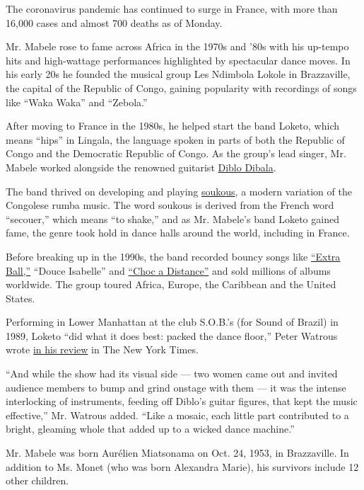 The coronavirus pandemic has continued to surge in France, with more
than 16,000 cases and almost 700 deaths as of Monday.

Mr. Mabele rose to fame across Africa in the 1970s and '80s with his
up-tempo hits and high-wattage performances highlighted by spectacular
dance moves. In his early 20s he founded the musical group Les Ndimbola
Lokole in Brazzaville, the capital of the Republic of Congo, gaining
popularity with recordings of songs like ``Waka Waka'' and ``Zebola.''

After moving to France in the 1980s, he helped start the band Loketo,
which means ``hips'' in Lingala, the language spoken in parts of both
the Republic of Congo and the Democratic Republic of Congo. As the
group's lead singer, Mr. Mabele worked alongside the renowned guitarist
\href{http://africanmusic.org/artists/diblo.html}{Diblo Dibala}.

The band thrived on developing and playing
\href{https://www.last.fm/tag/soukous}{soukous}, a modern variation of
the Congolese rumba music. The word soukous is derived from the French
word ``secouer,'' which means ``to shake,'' and as Mr. Mabele's band
Loketo gained fame, the genre took hold in dance halls around the world,
including in France.

Before breaking up in the 1990s, the band recorded bouncy songs like
\href{https://www.youtube.com/watch?v=ug4lzZNUo1M}{``Extra Ball,''}
``Douce Isabelle'' and
\href{https://www.dailymotion.com/video/x1ju7ip}{``Choc a Distance''}
and sold millions of albums worldwide. The group toured Africa, Europe,
the Caribbean and the United States.

Performing in Lower Manhattan at the club S.O.B.'s (for Sound of Brazil)
in 1989, Loketo ``did what it does best: packed the dance floor,'' Peter
Watrous wrote
\href{https://www.nytimes.com/1989/10/06/arts/review-music-congo-s-beat-lifts-a-crowd-to-its-feet-and-the-floor.html}{in
his review} in The New York Times.

``And while the show had its visual side --- two women came out and
invited audience members to bump and grind onstage with them --- it was
the intense interlocking of instruments, feeding off Diblo's guitar
figures, that kept the music effective,'' Mr. Watrous added. ``Like a
mosaic, each little part contributed to a bright, gleaming whole that
added up to a wicked dance machine.''

Mr. Mabele was born Aurélien Miatsonama on Oct. 24, 1953, in
Brazzaville. In addition to Ms. Monet (who was born Alexandra Marie),
his survivors include 12 other children.


